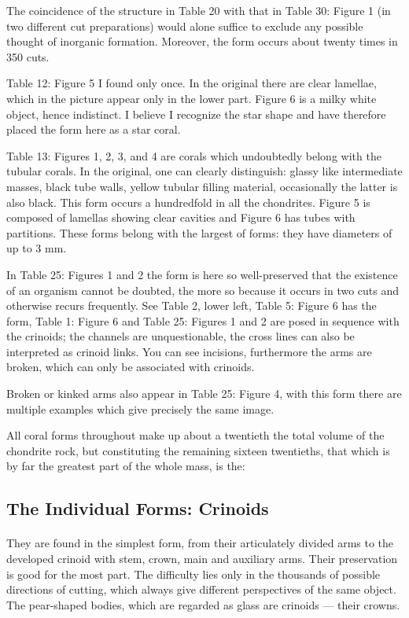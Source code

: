 \documentclass[a4paper, 12pt, oneside]{article}
\begin{document}
The coincidence of the structure in Table 20 with that in Table 30: Figure 1 (in two different cut preparations) would alone suffice to exclude any possible thought of inorganic formation. Moreover, the form occurs about twenty times in 350 cuts.

Table 12: Figure 5 I found only once. In the original there are clear lamellae, which in the picture appear only in the lower part. Figure 6 is a milky white object, hence indistinct. I believe I recognize the star shape and have therefore placed the form here as a star coral.

Table 13: Figures 1, 2, 3, and 4 are corals which undoubtedly belong with the tubular corals. In the original, one can clearly distinguish: glassy like intermediate masses, black tube walls, yellow tubular filling material, occasionally the latter is also black. This form occurs a hundredfold in all the chondrites. Figure 5 is composed of lamellas showing clear cavities and Figure 6 has tubes with partitions. These forms belong with the largest of forms: they have diameters of up to 3 mm.

In Table 25: Figures 1 and 2 the form is here so well-preserved that the existence of an organism cannot be doubted, the more so because it occurs in two cuts and otherwise recurs frequently. See Table 2, lower left, Table 5: Figure 6 has the form, Table 1: Figure 6 and Table 25: Figures 1 and 2 are posed in sequence with the crinoids; the channels are unquestionable, the cross lines can also be interpreted as crinoid links. You can see incisions, furthermore the arms are broken, which can only be associated with crinoids.

Broken or kinked arms also appear in Table 25: Figure 4, with this form there are multiple examples which give precisely the same image.

All coral forms throughout make up about a twentieth the total volume of the chondrite rock, but constituting the remaining sixteen twentieths, that which is by far the greatest part of the whole mass, is the:
\clearpage
\subsection{The Individual Forms: Crinoids}
\paragraph*{}
They are found in the simplest form, from their articulately divided arms to the developed crinoid with stem, crown, main and auxiliary arms. Their preservation is good for the most part. The difficulty lies only in the thousands of possible directions of cutting, which always give different perspectives of the same object. The pear-shaped bodies, which are regarded as glass are crinoids --- their crowns.
\end{document}
